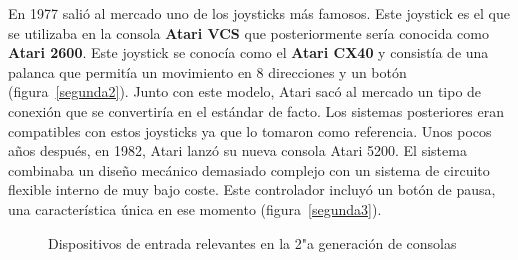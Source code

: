 En 1977 sali\'o al mercado uno de los joysticks m\'as famosos. Este joystick es el que se utilizaba en la consola \textbf{Atari VCS} que posteriormente ser\'ia conocida como \textbf{Atari 2600}. Este joystick se conoc\'ia como el \textbf{Atari CX40} y consist\'ia de una palanca que permit\'ia un movimiento en 8 direcciones y un bot\'on (figura~\ref{segunda2}). Junto con este modelo, Atari sac\'o al mercado un tipo de conexi\'on que se convertir\'ia en el est\'andar de facto. Los sistemas posteriores eran compatibles con estos joysticks ya que lo tomaron como referencia. Unos pocos a\~nos despu\'es, en 1982, Atari lanz\'o su nueva consola Atari 5200. El sistema combinaba un dise\~no mec\'anico demasiado complejo con un sistema de circuito flexible interno de muy bajo coste. Este controlador incluy\'o un bot\'on de pausa, una caracter\'istica \'unica en ese momento (figura~\ref{segunda3}).\\


\begin{figure}[t]
     \hfill
\hfill
     \caption{Dispositivos de entrada relevantes en la 2"a  generaci\'on de consolas}
     \label{fig:segunda}
   \end{figure}

